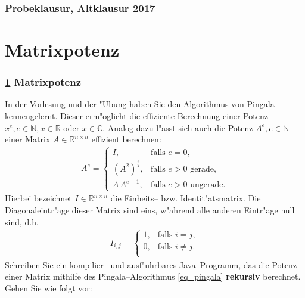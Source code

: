 \documentclass[9pt,german]{beamer}%
\begin{document}
\maketitle%
\addtocounter{framenumber}{-1}%

\begin{frame}
  \frametitle{Probeklausur, Altklausur 2017}%
\tableofcontents
\end{frame}

\def\stitle{Matrixpotenz}
\section{\stitle}\label{S:matrix}
\begin{frame}[t]%
  \frametitle{\ref{S:matrix} \stitle}
In der Vorlesung und der "Ubung haben Sie den Algorithmus von Pingala kennengelernt. Dieser erm"oglicht die
effiziente Berechnung einer Potenz $x^e, e\in\mathbb N, x\in\mathbb R$ oder $x\in\mathbb C$. Analog dazu
l"asst sich auch die Potenz $A^e, e\in\mathbb N$ einer Matrix $A\in\mathbb R^{n \times n}$ effizient
berechnen:
\begin{align}
 \label{eq_pingala}
 A^e =
  \begin{cases}
   I, & \text{falls } e=0,\\
   (A^2)^{\frac{e}{2}}, & \text{falls $e>0$ gerade},\\
   A\,A^{e-1}, & \text{falls $e>0$ ungerade}.
  \end{cases}
\end{align}
Hierbei bezeichnet $I\in\mathbb R^{n \times n}$ die Einheits-- bzw. Identit"atsmatrix. Die Diagonaleintr"age dieser
Matrix sind eins, w"ahrend alle anderen Eintr"age null sind, d.h.
\begin{align*}
 I_{i,j} =
 \begin{cases}
   1, &\text{falls } i=j,\\
   0, &\text{falls } i\neq j.\\
 \end{cases}
\end{align*}
Schreiben Sie ein kompilier-- und ausf"uhrbares Java--Programm, das die Potenz einer Matrix mithilfe des
Pingala--Algorithmus \eqref{eq_pingala} \textbf{rekursiv} berechnet. Gehen Sie wie folgt vor:\\[1em]

\end{frame}
\end{document}
